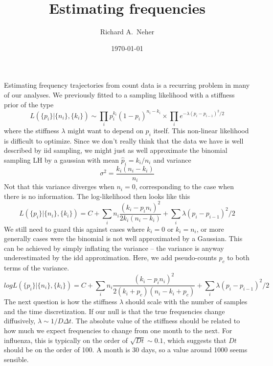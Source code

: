 \documentclass[aps,rmp, onecolumn]{revtex4}
\begin{document}
\title{Estimating frequencies}
\author{Richard A.~Neher}
\date{\today}
\maketitle

Estimating frequency trajectories from count data is a recurring problem in many of our analyses.
We previously fitted to a sampling likelihood with a stiffness prior of the type
\begin{equation}
    L(\{p_i\} | \{n_i\}, \{k_i\}) \sim \prod_i p_i^{k_i} (1-p_i)^{n_i-k_i} \times \prod_i e^{ - \lambda (p_i - p_{i-1})^2/2}
\end{equation}
where the stiffness $\lambda$ might want to depend on $p_i$ itself.
This non-linear likelihood is difficult to optimize.
Since we don't really think that the data we have is well described by iid sampling, we might just as well approximate the binomial sampling LH by a gaussian with mean $\hat{p}_i = k_i/n_i$ and variance
\begin{equation}
    \sigma^2 = \frac{k_i(n_i-k_i)}{n_i}
\end{equation}
Not that this variance diverges when $n_i=0$, corresponding to the case when there is no information.
The log-likelihood then looks like this
\begin{equation}
    L(\{p_i\} | \{n_i\}, \{k_i\}) = C + \sum_i n_i\frac{(k_i - p_i n_i)^2}{2k_i(n_i-k_i)}  + \sum_i \lambda (p_i - p_{i-1})^2/2
\end{equation}
We still need to guard this against cases where $k_i=0$ or $k_i=n_i$, or more generally cases were the binomial is not well approximated by a Gaussian. This can be achieved by simply inflating the variance -- the variance is anyway underestimated by the idd approximation.
Here, we add pseudo-counts $p_c$ to both terms of the variance.
\begin{equation}
    logL(\{p_i\} | \{n_i\}, \{k_i\}) = C + \sum_i n_i\frac{(k_i - p_i n_i)^2}{2(k_i+p_c)(n_i-k_i+p_c)}  + \sum_i \lambda (p_i - p_{i-1})^2/2
\end{equation}
The next question is how the stiffness $\lambda$ should scale with the number of samples and the time discretization.
If our null is that the true frequencies change diffusively, $\lambda \sim 1/D\Delta t$.
The absolute value of the stiffness should be related to how much we expect frequencies to change from one month to the next.
For influenza, this is typically on the order of $\sqrt{Dt} \sim 0.1$, which suggests that $Dt$ should be on the order of 100.
A month is 30 days, so a value around 1000 seems sensible.
\end{document}
